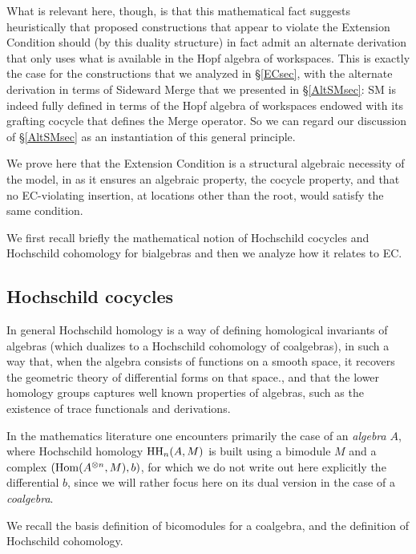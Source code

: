 \documentclass[12pt]{amsart}
\numberwithin{equation}{section}
\def\Hom{{\rm Hom}}
\begin{document}
\smallskip

What is relevant here, though, is that this mathematical fact suggests 
heuristically that proposed constructions that appear to violate the
Extension Condition should (by this duality structure) in fact admit 
an alternate derivation that only uses what is available in the Hopf
algebra of workspaces. This is exactly the case for the constructions
that we analyzed in \S \ref{ECsec}, with the alternate derivation in
terms of Sideward Merge that we presented in \S \ref{AltSMsec}:
SM is indeed fully defined in terms of the Hopf algebra of workspaces 
endowed with its grafting cocycle that defines the Merge operator. 
So we can regard our discussion of \S \ref{AltSMsec} as an instantiation 
of this general principle.

\smallskip

We prove here that the Extension Condition is a structural algebraic necessity of the
model, in as it ensures an algebraic property, the cocycle property,
and that no EC-violating insertion, at locations other than the root, would
satisfy the same condition.

\smallskip

We first recall briefly the mathematical notion of Hochschild cocycles
and Hochschild cohomology for bialgebras and then we analyze how
it relates to EC.

\smallskip
\subsection{Hochschild  cocycles}\label{HochCocycleSec}

In general Hochschild homology is a way of defining
homological invariants of algebras (which dualizes to a
Hochschild cohomology of coalgebras), in such a way
that, when the algebra consists of functions on a smooth space, it
recovers the geometric theory of differential forms on that space.,
and that the lower homology groups captures well known
properties of algebras, such as the existence of trace
functionals and derivations. 

In the mathematics literature one encounters primarily the case of 
an {\em algebra} $A$, where Hochschild homology ${\rm HH}_n(A,M)$ is built 
using a bimodule $M$ and a complex $(\Hom(A^{\otimes n}, M), b)$, 
for which we do not write out here explicitly the differential $b$, since 
we will rather focus here on its dual version in the case of a {\em coalgebra}. 

We recall the basis definition of bicomodules for a coalgebra, and the
definition of Hochschild cohomology.
\end{document}
